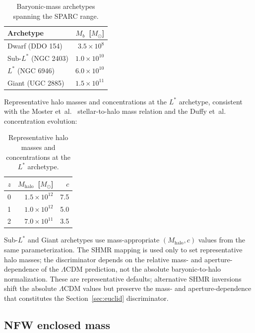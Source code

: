 \documentclass[11pt,a4paper]{article}
\numberwithin{equation}{section}
\numberwithin{table}{section}
\numberwithin{figure}{section}
\newcommand{\Msun}{M_\odot}
\newcommand{\Mb}{M_b}
\newcommand{\Mhalo}{M_\text{halo}}
\begin{document}
\begin{table}[!ht]
\centering
\caption{Baryonic-mass archetypes spanning the SPARC range.}
\label{tab:archetypes}
\begin{tabular}{l r}
\toprule
Archetype & $\Mb$~[$\Msun$] \\
\midrule
Dwarf (DDO 154)      & $3.5 \times 10^8$    \\
Sub-$L^*$ (NGC 2403) & $1.0 \times 10^{10}$ \\
$L^*$ (NGC 6946)     & $6.0 \times 10^{10}$ \\
Giant (UGC 2885)     & $1.5 \times 10^{11}$ \\
\bottomrule
\end{tabular}
\end{table}

Representative halo masses and concentrations at the $L^*$ archetype,
consistent with the Moster et~al.\ \citep{Moster2013} stellar-to-halo mass relation and
the Duffy et~al.\ \citep{Duffy2008} concentration evolution:

\begin{table}[!ht]
\centering
\caption{Representative halo masses and concentrations at the $L^*$
archetype.}
\label{tab:halo-params}
\begin{tabular}{r r r}
\toprule
$z$ & $\Mhalo$~[$\Msun$] & $c$ \\
\midrule
0 & $1.5 \times 10^{12}$ & 7.5 \\
1 & $1.0 \times 10^{12}$ & 5.0 \\
2 & $7.0 \times 10^{11}$ & 3.5 \\
\bottomrule
\end{tabular}
\end{table}

Sub-$L^*$ and Giant archetypes use mass-appropriate $(\Mhalo, c)$
values from the same parameterization. The SHMR mapping is used only
to set representative halo masses; the discriminator depends on the
relative mass- and aperture-dependence of the $\Lambda$CDM prediction,
not the absolute baryonic-to-halo normalization. These are
representative defaults; alternative SHMR inversions shift the absolute
$\Lambda$CDM values but preserve the mass- and aperture-dependence
that constitutes the Section~\ref{sec:euclid} discriminator.

\subsection{NFW enclosed mass}
\label{app:nfw}
\end{document}
